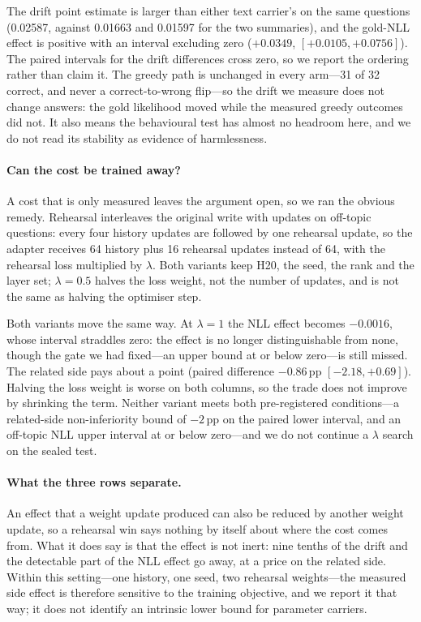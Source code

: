 \documentclass[sigconf,nonacm]{acmart}
\begin{document}
The drift point estimate is larger than either text carrier's on the same questions (0.02587, against 0.01663 and
0.01597 for the two summaries), and the gold-NLL effect is positive with an interval excluding zero ($+0.0349$,
$[+0.0105,+0.0756]$). The paired intervals for the drift differences cross zero, so we report the ordering rather
than claim it. The greedy path is unchanged in every arm---31 of 32 correct, and never a correct-to-wrong
flip---so the drift we measure does not change answers: the gold likelihood moved while the measured greedy
outcomes did not. It also means the behavioural test has almost no headroom here, and we do not read its stability
as evidence of harmlessness.

\paragraph{Can the cost be trained away?} A cost that is only measured leaves the argument open, so we ran the
obvious remedy. Rehearsal interleaves the original write with updates on off-topic questions: every four history
updates are followed by one rehearsal update, so the adapter receives 64 history plus 16 rehearsal updates
instead of 64, with the rehearsal loss multiplied by $\lambda$. Both variants keep H20, the seed, the rank and the
layer set; $\lambda{=}0.5$ halves the loss weight, not the number of updates, and is not the same as halving the
optimiser step.

Both variants move the same way. At $\lambda{=}1$ the NLL effect becomes $-0.0016$, whose interval straddles
zero: the effect is no longer distinguishable from none, though the gate we had fixed---an upper bound at or
below zero---is still missed. The related side pays about a point (paired difference $-0.86$\,pp
$[-2.18,+0.69]$). Halving the loss weight is worse on both columns, so the trade does not improve by shrinking
the term. Neither variant meets both pre-registered conditions---a related-side non-inferiority bound of
$-2$\,pp on the paired lower interval, and an off-topic NLL upper interval at or below zero---and we do not
continue a $\lambda$ search on the sealed test.

\paragraph{What the three rows separate.} An effect that a weight update produced can also be reduced by another
weight update, so a rehearsal win says nothing by itself about where the cost comes from. What it does say is that
the effect is not inert: nine tenths of the drift and the detectable part of the NLL effect go away, at a price on
the related side. Within this setting---one history, one seed, two rehearsal weights---the measured side effect is
therefore sensitive to the training objective, and we report it that way; it does not identify an intrinsic lower
bound for parameter carriers.
\end{document}
